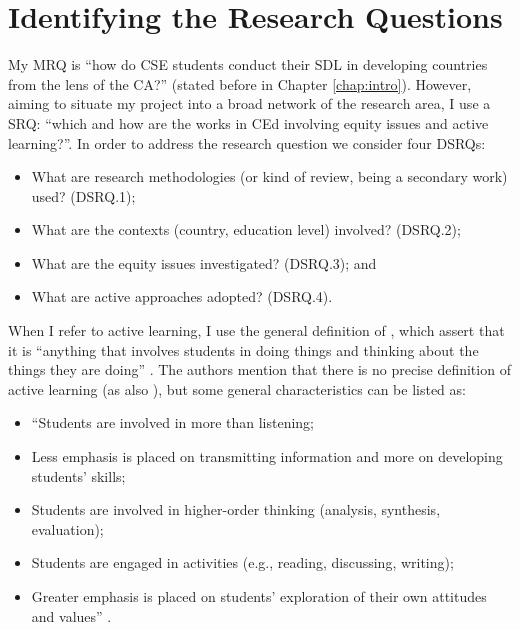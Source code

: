 \section{Identifying the Research Questions}
\label{rel-work:res-questions}

My \acrfull{MRQ} is “how do \acrfull{CSE} students conduct their \acrfull{SDL} in developing countries from the lens of the \acrfull{CA}?” (stated before in Chapter \ref{chap:intro}). However, aiming to situate my project into a broad network of the research area, I use a \gls{SRQ}: “which and how are the works in \acrfull{CEd} involving equity issues and active learning?”. In order to address the research question we consider four \glspl{DSRQ}:
\begin{itemize}
    \item What are research methodologies (or kind of review, being a secondary work) used? (\gls{DSRQ}.1);
    \item What are the contexts (country, education level) involved? (\gls{DSRQ}.2);
    \item What are the equity issues investigated? (\gls{DSRQ}.3); and
    \item What are active approaches adopted? (\gls{DSRQ}.4).
\end{itemize}

When I refer to active learning, I use the general definition of , which assert that it is “anything that involves students in doing things and thinking about the things they are doing” \cite[p.~19]{bonwell:1991}. The authors mention that there is no precise definition of active learning (as also ), but some general characteristics can be listed as:
\begin{itemize}
    \item “Students are involved in more than listening;
    \item Less emphasis is placed on transmitting information and more on developing students’ skills;
    \item Students are involved in higher-order thinking (analysis, synthesis, evaluation);
    \item Students are engaged in activities (e.g., reading, discussing, writing);
    \item Greater emphasis is placed on students’ exploration of their own attitudes and values” \cite[p.~19]{bonwell:1991}.
\end{itemize}

